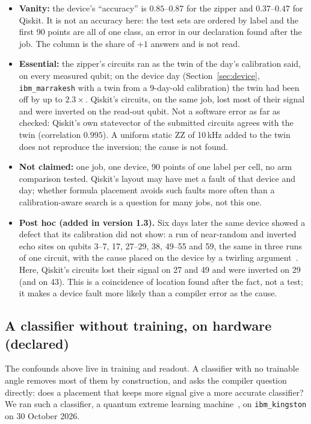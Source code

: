 \documentclass[11pt]{article}
\begin{document}
\begin{itemize}
\item \textbf{Vanity:} the device's ``accuracy'' is $0.85$--$0.87$ for the zipper and $0.37$--$0.47$ for Qiskit. It is
not an accuracy here: the test sets are ordered by label and the first 90 points are all of one class, an error in our
declaration found after the job. The column is the share of $+1$ answers and is not read.
\item \textbf{Essential:} the zipper's circuits ran as the twin of the day's calibration said, on every measured qubit;
on the device day (Section~\ref{sec:device}, \texttt{ibm\_marrakesh} with a twin from a 9-day-old calibration) the
twin had been off by up to $2.3\times$. Qiskit's circuits, on the same job, lost most of their signal and were inverted on the read-out
qubit. Not a software error as far as checked: Qiskit's own statevector of the submitted circuits agrees with the twin
(correlation $0.995$). A uniform static ZZ of 10\,kHz added to the twin does not reproduce the inversion; the cause is
not found.
\item \textbf{Not claimed:} one job, one device, 90 points of one label per cell, no arm comparison tested. Qiskit's
layout may have met a fault of that device and day; whether formula placement avoids such faults more often than a
calibration-aware search is a question for many jobs, not this one.
\item \textbf{Post hoc (added in version 1.3).} Six days later the same device showed a defect that its calibration
  did not show: a run of near-random and inverted echo sites on qubits 3--7, 17, 27--29, 38, 49--55 and 59, the same in
  three runs of one circuit, with the cause placed on the device by a twirling argument~\cite{paper5}. Here, Qiskit's
  circuits lost their signal on 27 and 49 and were inverted on 29 (and on 43). This is a coincidence of location found
  after the fact, not a test; it makes a device fault more likely than a compiler error as the cause.
\end{itemize}
\subsection{A classifier without training, on hardware (declared)}
\label{sec:qelm}

The confounds above live in training and readout. A classifier with no trainable angle removes most of them by
construction, and asks the compiler question directly: does a placement that keeps more signal give a more accurate
classifier? We ran such a classifier, a quantum extreme learning machine~\cite{innocenti2023}, on
\texttt{ibm\_kingston} on 30 October 2026.
\end{document}
